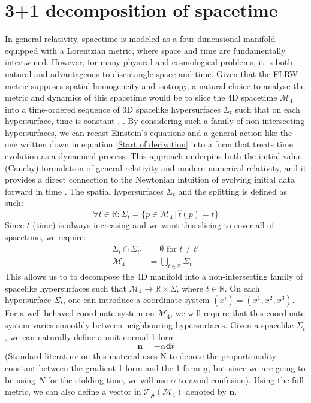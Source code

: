\documentclass[aps,prd,reprint,preprintnumbers,showpacs,floatfix,nofootinbib,superscript address]{revtex4-2}
\begin{document}
\section{3+1 decomposition of spacetime} \label{3+1 decomposition of spacetime}
In general relativity, spacetime is modeled as a four-dimensional manifold equipped with a Lorentzian metric, where space and time are fundamentally intertwined. However, for many physical and cosmological problems, it is both natural and advantageous to disentangle space and time. Given that the FLRW metric supposes spatial homogeneity and isotropy, a natural choice to analyse the metric and dynamics of this spacetime would be to slice the 4D spacetime $\mathcal{M}_4$ into a time-ordered sequence of 3D spacelike hypersurfaces $\Sigma_t$ such that on each hypersurface, time is constant \cite{baumann2012tasilecturesinflation}, 
\cite{gourgoulhon_31_2007}. By considering such a family of non-intersecting hypersurfaces, we can recast Einstein's equations and a general action like the one written down in equation \ref{Start of derivation} into a form that treats time evolution as a dynamical process. This approach underpins both the initial value (Cauchy) formulation of general relativity and modern numerical relativity, and it provides a direct connection to the Newtonian intuition of evolving initial data forward in time \cite{choquet-bruhat_global_1969}. The spatial hypersurfaces $\Sigma_t$ and the splitting is defined as such:
\begin{equation}
    \forall t \in \mathbb{R} : \Sigma_t = \{p \in \mathcal{M}_4 \, | \, \hat{t} (p) = t\} \nonumber
\end{equation}
Since $t$ (time) is always increasing and we want this slicing to cover all of spacetime, we require:
\begin{align}
    \Sigma_t \cap \Sigma_{t'} &= \emptyset \,\, \text{for}\,\, t \neq t' \nonumber \\
    \mathcal{M}_4 &= \bigcup_{t \in \mathbb{R}} \Sigma_t \nonumber
\end{align}
This allows us to to decompose the 4D manifold into a non-intersecting family of spacelike hypersurfaces such that $\mathcal{M}_4 \rightarrow \mathbb{R} \times \Sigma$, where $t \in \mathbb{R}$. On each hypersurface $\Sigma_t$, one can introduce a coordinate system $(x^i) = (x^1,x^2,x^3)$. For a well-behaved coordinate system on $\mathcal{M}_4$, we will require that this coordinate system varies smoothly between neighbouring hypersurfaces. Given a spacelike $\Sigma_t$, we can naturally define a unit normal 1-form 
\begin{equation} \label{unit 1-form}
    \underline{\bm{n}} = - \alpha \textbf{d}t    
\end{equation}
(Standard literature on this material uses N to denote the proportionality constant between the gradient 1-form and the 1-form $\underline{\bm{n}}$, but since we are going to be using $N$ for the efolding time, we will use $\alpha$ to avoid confusion). Using the full metric, we can also define a vector in $\mathcal{T_p}(\mathcal{M}_4)$ denoted by $\bm{n}$.
\end{document}
